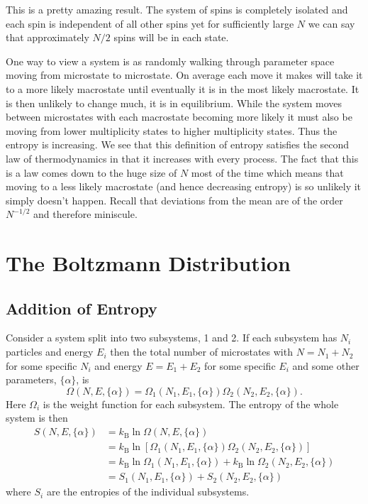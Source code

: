 \documentclass[a4paper]{article}
\newcommand{\boltzmann}{k_\mathrm{B}}
\begin{document}
    This is a pretty amazing result.
    The system of spins is completely isolated and each spin is independent of all other spins yet for sufficiently large \(N\) we can say that approximately \(N/2\) spins will be in each state.
    
    One way to view a system is as randomly walking through parameter space moving from microstate to microstate.
    On average each move it makes will take it to a more likely macrostate until eventually it is in the most likely macrostate.
    It is then unlikely to change much, it is in equilibrium.
    While the system moves between microstates with each macrostate becoming more likely it must also be moving from lower multiplicity states to higher multiplicity states.
    Thus the entropy is increasing.
    We see that this definition of entropy satisfies the second law of thermodynamics in that it increases with every process.
    The fact that this is a law comes down to the huge size of \(N\) most of the time which means that moving to a less likely macrostate (and hence decreasing entropy) is so unlikely it simply doesn't happen.
    Recall that deviations from the mean are of the order \(N^{-1/2}\) and therefore miniscule.
    
    \section{The Boltzmann Distribution}
    \subsection{Addition of Entropy}
    Consider a system split into two subsystems, 1 and 2.
    If each subsystem has \(N_i\) particles and energy \(E_i\) then the total number of microstates with \(N = N_1 + N_2\) for some specific \(N_i\) and energy \(E = E_1 + E_2\) for some specific \(E_i\) and some other parameters, \(\{\alpha\}\), is
    \[\Omega(N, E, \{\alpha\}) = \Omega_1(N_1, E_1, \{\alpha\})\Omega_2(N_2, E_2, \{\alpha\}).\]
    Here \(\Omega_i\) is the weight function for each subsystem.
    The entropy of the whole system is then
    \begin{align*}
        S(N, E, \{\alpha\}) &= \boltzmann\ln\Omega(N, E, \{\alpha\})\\
        &= \boltzmann\ln[\Omega_1(N_1, E_1, \{\alpha\})\Omega_2(N_2, E_2, \{\alpha\})]\\
        &= \boltzmann\ln \Omega_1(N_1, E_1, \{\alpha\}) + \boltzmann\ln\Omega_2(N_2, E_2, \{\alpha\})\\
        &= S_1(N_1, E_1, \{\alpha\}) + S_2(N_2, E_2, \{\alpha\})
    \end{align*}
    where \(S_i\) are the entropies of the individual subsystems.
    
\end{document}
